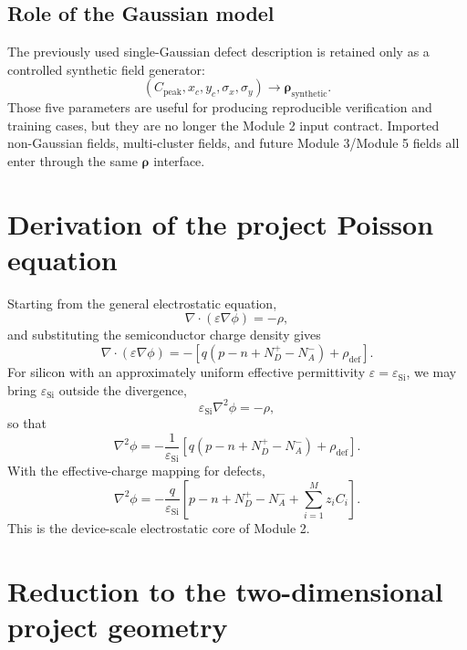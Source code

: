 \documentclass[11pt]{article}
\begin{document}
\subsection*{Role of the Gaussian model}

The previously used single-Gaussian defect description is retained only as a controlled synthetic field generator:
\begin{equation}
(C_{\mathrm{peak}},x_c,y_c,\sigma_x,\sigma_y)
\longrightarrow
\bm{\rho}_{\mathrm{synthetic}}.
\end{equation}
Those five parameters are useful for producing reproducible verification and training cases, but they are no longer the Module 2 input contract. Imported non-Gaussian fields, multi-cluster fields, and future Module 3/Module 5 fields all enter through the same $\bm{\rho}$ interface.

\section{Derivation of the project Poisson equation}

Starting from the general electrostatic equation,
\begin{equation}
\nabla \cdot (\varepsilon \nabla \phi) = -\rho,
\end{equation}
and substituting the semiconductor charge density gives
\begin{equation}
\nabla \cdot (\varepsilon \nabla \phi)
= -\left[q(p - n + N_D^+ - N_A^-) + \rho_{\mathrm{def}}\right].
\end{equation}
For silicon with an approximately uniform effective permittivity $\varepsilon = \varepsilon_{\mathrm{Si}}$, we may bring $\varepsilon_{\mathrm{Si}}$ outside the divergence,
\begin{equation}
\varepsilon_{\mathrm{Si}} \nabla^2 \phi = -\rho,
\end{equation}
so that
\begin{equation}
\nabla^2 \phi = -\frac{1}{\varepsilon_{\mathrm{Si}}}
\left[q(p - n + N_D^+ - N_A^-) + \rho_{\mathrm{def}}\right].
\end{equation}
With the effective-charge mapping for defects,
\begin{equation}
\nabla^2 \phi = -\frac{q}{\varepsilon_{\mathrm{Si}}}
\left[p - n + N_D^+ - N_A^- + \sum_{i=1}^{M} z_i C_i\right].
\end{equation}
This is the device-scale electrostatic core of Module 2.

\section{Reduction to the two-dimensional project geometry}
\end{document}
